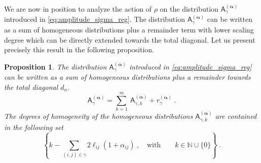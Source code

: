 \documentclass[11pt]{book}
\newcommand{\alphabd}{\boldsymbol{\alpha}}
\newcommand{\Nbb}{\mathbb{N}}
\newcommand{\Asf}{\mathsf{A}}
\theoremstyle{break}
\newtheorem{proposition}{Proposition}[chapter]
\begin{document}
We are now in position to analyze the action of $\rho$ on the distribution $\Asf_\gamma^{(\alphabd)}$ introduced in \eqref{eq:amplitude_sigma_reg}. The distribution $\Asf_\gamma^{(\alphabd)}$ can be written as a sum of homogeneous distributions plus a remainder term with lower scaling degree which can be directly extended towards the total diagonal. Let us present precisely this result in the following proposition.


\begin{proposition}\label{prop:almost_homo}
The distribution $\Asf_\gamma^{(\alphabd)}$ introduced in \eqref{eq:amplitude_sigma_reg} can be written as a sum of homogeneous distributions plus a remainder towards the total diagonal $d_n$.
%
\begin{equation*}
\Asf_\gamma^{(\alphabd)} = \sum_{k=1}^m \ \Asf_{\gamma,k}^{(\alphabd)} + r_\gamma^{(\alphabd)} \ .
\end{equation*}
%
The degrees of homogeneity of the homogeneous distributions $\Asf_{\gamma,k}^{(\alphabd)}$ are contained in the following set
%
\begin{equation}
\left\{k-\sum_{(i,j)\in\gamma} 2 \ell_{ij}(1+ \alpha_{ij}) \ , \quad \mbox{with} \qquad k \in \Nbb \cup \{0\} \right\} \ .
\label{eq:deg_homo_ak}
\end{equation}
%
\end{proposition}
\end{document}
